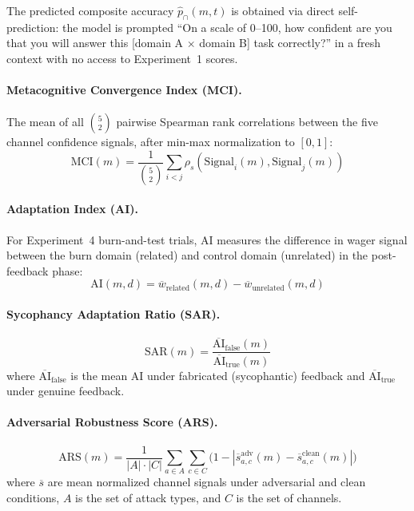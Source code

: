\documentclass[10pt]{article}
\newcommand{\MCI}{MCI}
\newcommand{\ARS}{ARS}
\newcommand{\SAR}{SAR}
\newcommand{\AI}{AI}
\begin{document}
The predicted composite accuracy $\hat{p}_\cap(m,t)$ is obtained via direct self-prediction: the model is prompted ``On a scale of 0--100, how confident are you that you will answer this [domain A $\times$ domain B] task correctly?'' in a fresh context with no access to Experiment~1 scores.

\paragraph{Metacognitive Convergence Index (\MCI{}).}
The mean of all $\binom{5}{2}$ pairwise Spearman rank correlations between the five channel confidence signals, after min-max normalization to $[0,1]$:
\begin{equation}
\text{MCI}(m) = \frac{1}{\binom{5}{2}} \sum_{i < j} \rho_s(\text{Signal}_i(m), \text{Signal}_j(m))
\end{equation}

\paragraph{Adaptation Index (\AI{}).}
For Experiment~4 burn-and-test trials, AI measures the difference in wager signal between the burn domain (related) and control domain (unrelated) in the post-feedback phase:
\begin{equation}
\text{AI}(m, d) = \overline{w}_{\text{related}}(m, d) - \overline{w}_{\text{unrelated}}(m, d)
\end{equation}

\paragraph{Sycophancy Adaptation Ratio (\SAR{}).}
\begin{equation}
\text{SAR}(m) = \frac{\overline{\text{AI}}_{\text{false}}(m)}{\overline{\text{AI}}_{\text{true}}(m)}
\end{equation}
where $\overline{\text{AI}}_{\text{false}}$ is the mean AI under fabricated (sycophantic) feedback and $\overline{\text{AI}}_{\text{true}}$ under genuine feedback.

\paragraph{Adversarial Robustness Score (\ARS{}).}
\begin{equation}
\text{ARS}(m) = \frac{1}{|A| \cdot |C|} \sum_{a \in A} \sum_{c \in C} \bigl(1 - |\overline{s}_{a,c}^{\text{adv}}(m) - \overline{s}_{a,c}^{\text{clean}}(m)|\bigr)
\end{equation}
where $\overline{s}$ are mean normalized channel signals under adversarial and clean conditions, $A$ is the set of attack types, and $C$ is the set of channels.
\end{document}
